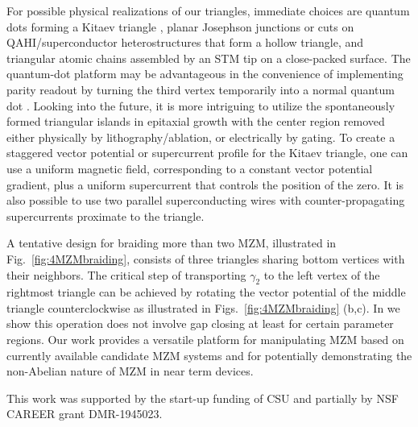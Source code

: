 \documentclass[aps,prb,showpacs,amsmath,twocolumn,amssymb,superscriptaddress]{revtex4-2}
\begin{document}
For possible physical realizations of our triangles, immediate choices are quantum dots forming a Kitaev triangle \cite{dvirRealizationMinimalKitaev2023}, planar Josephson junctions or cuts on QAHI/superconductor heterostructures \cite{xieCreatingLocalizedMajorana2021} that form a hollow triangle, and triangular atomic chains assembled by an STM tip \cite{schneiderPrecursorsMajoranaModes2022} on a close-packed surface. The quantum-dot platform may be advantageous in the convenience of implementing parity readout by turning the third vertex temporarily into a normal quantum dot \cite{mishmashDephasingLeakageDynamics2020,parity_QD_readout_2020, fengProbingRobustMajorana2022}. Looking into the future, it is more intriguing to utilize the spontaneously formed triangular islands in epitaxial growth \cite{pietzschSpinResolvedElectronicStructure2006} with the center region removed either physically by lithography/ablation, or electrically by gating. To create a staggered vector potential or supercurrent profile for the Kitaev triangle, one can use a uniform magnetic field, corresponding to a constant vector potential gradient, plus a uniform supercurrent that controls the position of the zero. It is also possible to use two parallel superconducting wires with counter-propagating supercurrents proximate to the triangle.

A tentative design for braiding more than two MZM, illustrated in Fig.~\ref{fig:4MZMbraiding}, consists of three triangles sharing bottom vertices with their neighbors. The critical step of transporting $\gamma_2$ to the left vertex of the rightmost triangle can be achieved by rotating the vector potential of the middle triangle counterclockwise as illustrated in Figs.~\ref{fig:4MZMbraiding} (b,c). In \cite{supp} we show this operation does not involve gap closing at least for certain parameter regions. Our work provides a versatile platform for manipulating MZM based on currently available candidate MZM systems and for potentially demonstrating the non-Abelian nature of MZM in near term devices.


\begin{acknowledgements}
This work was supported by the start-up funding of CSU and partially by NSF CAREER grant DMR-1945023.
\end{acknowledgements}



\end{document}
